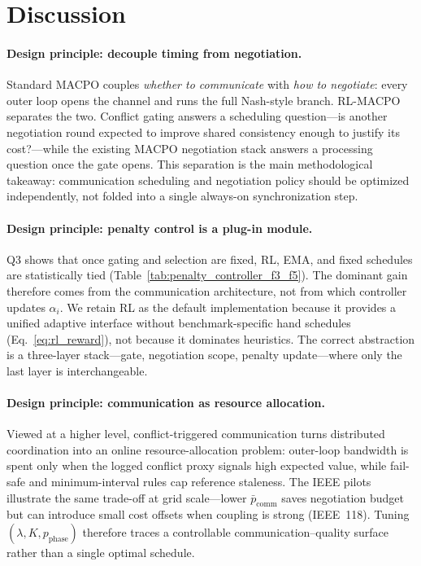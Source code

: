 \documentclass[conference]{IEEEtran}
\begin{document}
\section{Discussion}\label{sec:discussion}
\paragraph{Design principle: decouple timing from negotiation.}
Standard MACPO couples \emph{whether to communicate} with \emph{how to negotiate}: every outer loop opens the channel and runs the full Nash-style branch. RL-MACPO separates the two. Conflict gating answers a scheduling question---is another negotiation round expected to improve shared consistency enough to justify its cost?---while the existing MACPO negotiation stack answers a processing question once the gate opens. This separation is the main methodological takeaway: communication scheduling and negotiation policy should be optimized independently, not folded into a single always-on synchronization step.

\paragraph{Design principle: penalty control is a plug-in module.}
Q3 shows that once gating and selection are fixed, RL, EMA, and fixed schedules are statistically tied (Table~\ref{tab:penalty_controller_f3_f5}). The dominant gain therefore comes from the communication architecture, not from which controller updates $\alpha_i$. We retain RL as the default implementation because it provides a unified adaptive interface without benchmark-specific hand schedules (Eq.~\eqref{eq:rl_reward}), not because it dominates heuristics. The correct abstraction is a three-layer stack---gate, negotiation scope, penalty update---where only the last layer is interchangeable.

\paragraph{Design principle: communication as resource allocation.}
Viewed at a higher level, conflict-triggered communication turns distributed coordination into an online resource-allocation problem: outer-loop bandwidth is spent only when the logged conflict proxy signals high expected value, while fail-safe and minimum-interval rules cap reference staleness. The IEEE pilots illustrate the same trade-off at grid scale---lower $\bar p_{\mathrm{comm}}$ saves negotiation budget but can introduce small cost offsets when coupling is strong (IEEE~118). Tuning $(\lambda,K,p_{\mathrm{phase}})$ therefore traces a controllable communication--quality surface rather than a single optimal schedule.
\end{document}
